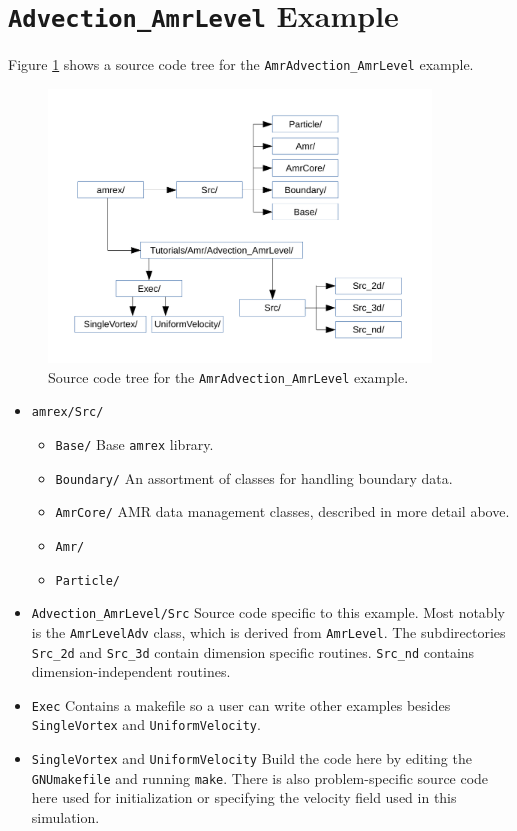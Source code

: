\section{{\tt Advection\_AmrLevel} Example}

Figure \ref{fig:AmrAdvection_AmrLevel_flowchart} shows a source
code tree for the {\tt AmrAdvection\_AmrLevel} example.
\begin{figure}[htb]
\begin{center}
\includegraphics[width=4in]{./AmrLevel/figs/flowchart.pdf}
\caption{\label{fig:AmrAdvection_AmrLevel_flowchart} Source code tree for the 
         {\tt AmrAdvection\_AmrLevel} example.}
\end{center}
\end{figure}
\begin{itemize}
\item {\tt amrex/Src/}
\begin{itemize}
\item {\tt Base/} Base {\tt amrex} library.
\item {\tt Boundary/} An assortment of classes for handling boundary data.
\item {\tt AmrCore/} AMR data management classes, described in more detail above.
\item {\tt Amr/}
\item {\tt Particle/}
\end{itemize}
\item {\tt Advection\_AmrLevel/Src} Source code specific to this example.  Most notably
is the {\tt AmrLevelAdv} class, which is derived from {\tt AmrLevel}.  The subdirectories {\tt Src\_2d}
and {\tt Src\_3d} contain dimension specific routines.  {\tt Src\_nd} contains dimension-independent routines.
\item {\tt Exec} Contains a makefile so a user can write other examples besides {\tt SingleVortex} and {\tt UniformVelocity}.
\item {\tt SingleVortex} and {\tt UniformVelocity}
Build the code here by editing the {\tt GNUmakefile} and running {\tt make}.  There
is also problem-specific source code here used for initialization or specifying the velocity field used in this
simulation.
\end{itemize}

